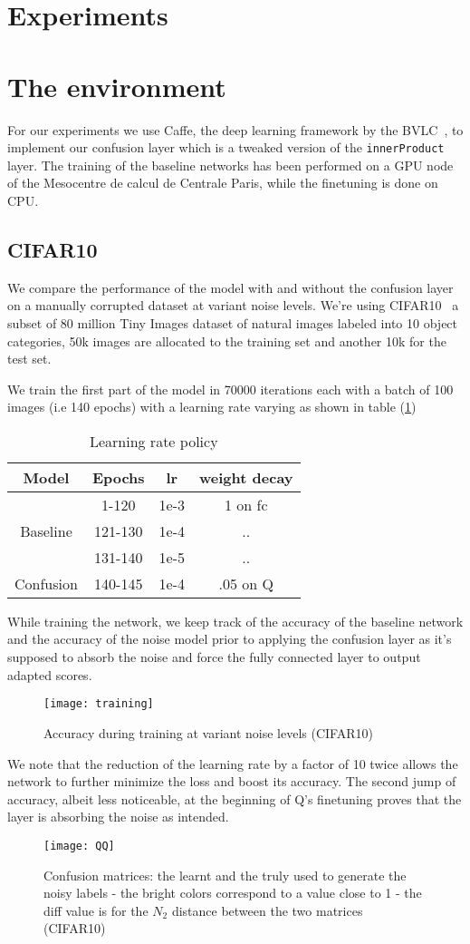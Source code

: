 \documentclass[10pt,twocolumn,letterpaper]{article}
\begin{document}
\section{Experiments}
\section{The environment}
For our experiments we use Caffe, the deep learning framework by the BVLC~\cite{jia2014caffe}, to implement our confusion layer which is a tweaked version of the \texttt{innerProduct} layer. The training of the baseline networks has been performed on a GPU node of the Mesocentre de calcul de Centrale Paris, while the finetuning is done on CPU.

\subsection{CIFAR10}
We compare the performance of the model with and without the confusion layer on a manually corrupted dataset at variant noise levels. We're using CIFAR10~\cite{krizhevsky2009learning} a subset of 80 million Tiny Images dataset of natural images labeled into 10 object categories, 50k images are allocated to the training set and another 10k for the test set.

We train the first part of the model in 70000 iterations each with a batch of 100 images (i.e 140 epochs) with a learning rate varying as shown in table (\ref{lr})
\begin{table}[H]
\centering
\begin{tabular}{|c|c|c|c|}
\hline
Model&Epochs&lr&weight decay\\
\hline
\multirow{3}{*}{Baseline}& 1-120&1e-3& 1 on fc\\
&121-130&1e-4&..\\
&131-140&1e-5&..\\
\hline
\hline
Confusion&140-145&1e-4&.05 on Q\\
\hline
\end{tabular}
\caption{Learning rate policy\label{lr}}
\end{table}
While training the network, we keep track of the accuracy of the baseline network and the accuracy of the noise model prior to applying the confusion layer as it's supposed to absorb the noise and force the fully connected layer to output adapted scores. 
\begin{figure}
    \centering
    \texttt{[image: training]}
    \caption{Accuracy during training at variant noise levels (CIFAR10)}
\end{figure}
We note that the reduction of the learning rate by a factor of 10 twice allows the network to further minimize the loss and boost its accuracy. The second jump of accuracy, albeit less noticeable, at the beginning of Q's finetuning proves that the layer is absorbing the noise as intended.
\begin{figure}
    \centering
    \texttt{[image: QQ]}
    \caption{Confusion matrices: the learnt and the truly used to generate the noisy labels - the bright colors correspond to a value close to 1 - the diff value is for the $N_2$ distance between the two matrices (CIFAR10)\label{qq}}
\end{figure}
\end{document}
